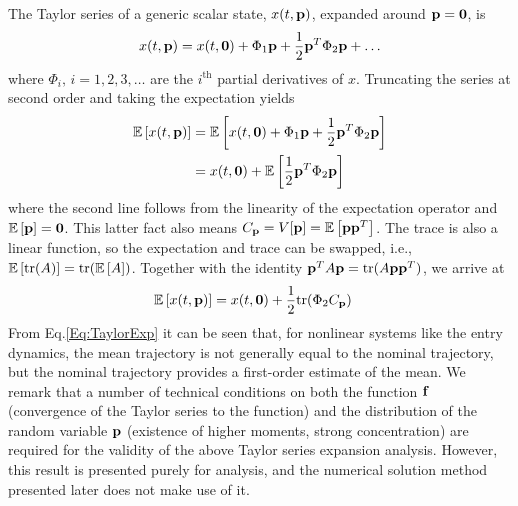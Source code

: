 The Taylor series of a generic scalar state, $x(t,\mathbf{p})$, expanded around $\mathbf{p}=\mathbf{0}$, is 
\begin{align}
	x(t,\mathbf{p}) = x(t,\mathbf{0}) + \Phi_1\mathbf{p} + \frac{1}{2}\mathbf{p}^T\Phi_2\mathbf{p} + \dots
\end{align} 
where $\Phi_i,\,i=1,2,3,\dots$ are the $i^{\mathrm{th}}$ partial derivatives of $x$. 
Truncating the series at second order and taking the expectation yields
\begin{align}
	\mathbb{E}\left[x(t,\mathbf{p})\right] &= \mathbb{E}\left[x(t,\mathbf{0}) + \Phi_1\mathbf{p} + \frac{1}{2}\mathbf{p}^T\Phi_2\mathbf{p}\right] \\
	 &= x(t,\mathbf{0}) + \mathbb{E}\left[\frac{1}{2}\mathbf{p}^T\Phi_2\mathbf{p}\right]
\end{align}
where the second line follows from the linearity of the expectation operator and $\mathbb{E}\left[\mathbf{p}\right] = \mathbf{0}$. This latter fact also means $C_{\mathbf{p}} = V[\mathbf{p}] = \mathbb{E}\left[\mathbf{p}\mathbf{p}^T\right]$. 
The trace is also a linear function, so the expectation and trace can be swapped, i.e., $\mathbb{E}\left[\mathrm{tr}(A)\right] = \mathrm{tr}(\mathbb{E}\left[A\right])$. Together with the identity $\mathbf{p}^TA\mathbf{p} = \mathrm{tr}(A\mathbf{p}\mathbf{p}^T)$, we arrive at
\begin{align}
	 	\mathbb{E}\left[x(t,\mathbf{p})\right] &= x(t,\mathbf{0}) + \frac{1}{2}\mathrm{tr}(\Phi_2C_{\mathbf{p}}) \label{Eq:TaylorExp}
\end{align}
From Eq.\eqref{Eq:TaylorExp} it can be seen that, for nonlinear systems like the entry dynamics, the mean trajectory is not generally equal to the nominal trajectory, but the nominal trajectory provides a first-order estimate of the mean. 
We remark that a number of technical conditions on both the function $\mathbf{f}$ (convergence of the Taylor series to the function) and the distribution of the random variable $\mathbf{p}$ (existence of higher moments, strong concentration) are required for the validity of the above Taylor series expansion analysis. However, this result is presented purely for analysis, and the numerical solution method presented later does not make use of it.



